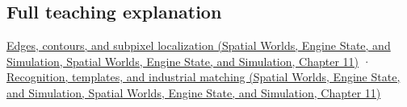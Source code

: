 \subsection{Full teaching explanation}\label{appendix-a5b0383b3b3e-full-teaching-explanation}

\href{../05-Spatial-Worlds-Engine-State-and-Simulation/main.pdf\#nameddest=04-visual-computing-ii-ch030-edges-contours-and-subpixel-localization}{Edges, contours, and subpixel localization (Spatial Worlds, Engine State, and Simulation, Spatial Worlds, Engine State, and Simulation, Chapter 11)} · \href{../05-Spatial-Worlds-Engine-State-and-Simulation/main.pdf\#nameddest=04-visual-computing-ii-ch030-recognition-templates-and-industrial-matching}{Recognition, templates, and industrial matching (Spatial Worlds, Engine State, and Simulation, Spatial Worlds, Engine State, and Simulation, Chapter 11)}
